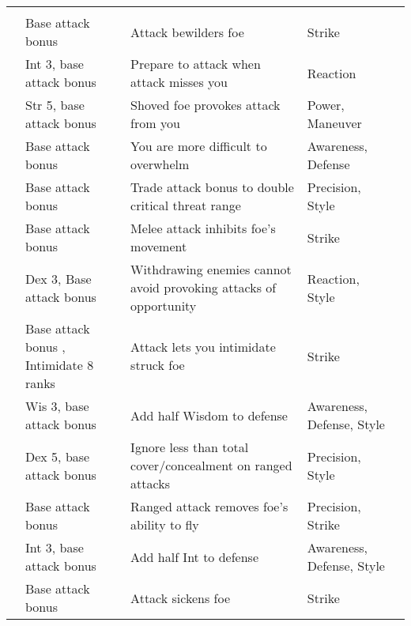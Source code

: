 {\begin{longtabu}{>{\lcol}p{10em} >{\lcol}p{15em} >{\lcol}X >{\lcol}p{6em} >{\lcol}p{3em}}
        \midrule
         &  &  &  &  \\
         & Base attack bonus  & Attack bewilders foe & Strike &  \\
         & Int 3, base attack bonus  & Prepare to attack when attack misses you & Reaction &  \\
         & Str 5, base attack bonus  & Shoved foe provokes attack from you & Power, Maneuver &  \\
         & Base attack bonus  & You are more difficult to overwhelm & Awareness, Defense &  \\
         & Base attack bonus  & Trade attack bonus to double critical threat range & Precision, Style &  \\
         & Base attack bonus  & Melee attack inhibits foe's movement & Strike &  \\
         & Dex 3, Base attack bonus  & Withdrawing enemies cannot avoid provoking attacks of opportunity & Reaction, Style &  \\
         & Base attack bonus , Intimidate 8 ranks & Attack lets you intimidate struck foe & Strike &  \\
         & Wis 3, base attack bonus  & Add half Wisdom to defense & Awareness, Defense, Style &  \\
         & Dex 5, base attack bonus  & Ignore less than total cover/concealment on ranged attacks & Precision, Style &  \\
         & Base attack bonus  & Ranged attack removes foe's ability to fly & Precision, Strike &  \\
         & Int 3, base attack bonus  & Add half Int to defense & Awareness, Defense, Style &  \\
         & Base attack bonus  & Attack sickens foe & Strike &  \\

\end{longtabu}}
